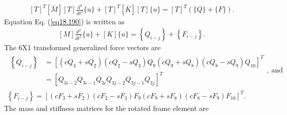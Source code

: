 \documentclass{AeroStructure-ERJohnson}
\begin{document}
\begin{align}\label{eq18.190}
[T]^{T}[\overline{M}][T] \frac{d^{2}}{d t^{2}}\{u\}+[T]^{T}[\overline{K}][T]\{u\}=[T]^{T}(\{Q\}+\{F\}).
\end{align}
Equation Eq. (\ref{eq18.190}) is written as
\begin{align}\label{eq18.191}
[M] \frac{d^{2}}{d t^{2}}\{u\}+[K]\{u\}=\left\{Q_{i-j}\right\}+\left\{F_{i-j}\right\}.
\end{align}
The 6X1 transformed generalized force vectors are
\begin{align}\label{eq18.192}
\begin{aligned}\left\{Q_{i-j}\right\} &=\left[\left(c Q_{3}+s Q_{2}\right)\left(c Q_{2}-s Q_{3}\right) Q_{9}\left(c Q_{9}+s Q_{8}\right)\left(c Q_{8}-s Q_{9}\right) Q_{10}\right]^{T} \\&=\left[Q_{3 i-2} Q_{3 i-1} Q_{3 i} Q_{3 j-2} Q_{3 j-1} Q_{3 j}\right]^{T}\end{aligned},\ \text{and}\\
\label{eq18.193}
\left\{F_{i-j}\right\}=\left[\left(c F_{3}+s F_{2}\right)\left(c F_{2}-s F_{3}\right) F_{9}\left(c F_{9}+s F_{8}\right)\left(c F_{8}-s F_{9}\right) F_{10}\right]^{T}.
\end{align}
The mass and stiffness matrices for the rotated frame element are
\end{document}
